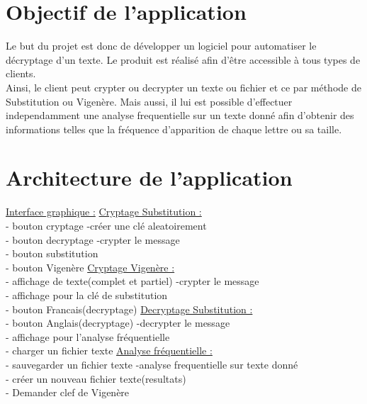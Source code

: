 \documentclass[a4]{article}
\begin{document}
	\section{Objectif de l'application}
	
	
	Le but du projet est donc de développer un logiciel pour automatiser le décryptage d'un texte.
  Le produit est réalisé afin d'être accessible à tous types de clients.\\
  Ainsi, le client peut crypter ou decrypter un texte ou fichier et ce par méthode de Substitution ou Vigenère.
  Mais aussi, il lui est possible d'effectuer independamment une analyse frequentielle sur un texte donné afin d'obtenir
des informations telles que la fréquence d'apparition de chaque lettre ou sa taille.
	
	

	\section{Architecture de l'application}
			\underline{Interface graphique :}     \hspace{5cm}  \underline{Cryptage Substitution :}\\
			- bouton cryptage            \hspace{5.5cm}       -créer une clé aleatoirement\\
			- bouton decryptage         \hspace{5cm}        -crypter le message\\
			- bouton substitution\\
			- bouton Vigenère           \hspace{5.2cm}       \underline{Cryptage Vigenère :}\\
			- affichage de texte(complet et partiel)  \hspace{2.2cm} -crypter le message\\
			- affichage pour la clé de substitution\\
			- bouton Francais(decryptage)   \hspace{3.5cm}     \underline{Decryptage Substitution :}\\
			- bouton Anglais(decryptage)    \hspace{3.5cm}     -decrypter le message\\
			- affichage pour l'analyse fréquentielle\\
			- charger un fichier texte       \hspace{4.2cm}  \underline{Analyse fréquentielle :}\\
			- sauvegarder un fichier texte     \hspace{3.8cm}  -analyse frequentielle sur texte donné\\
			- créer un nouveau fichier texte(resultats)\\
			- Demander clef de Vigenère\\
			
\end{document}
